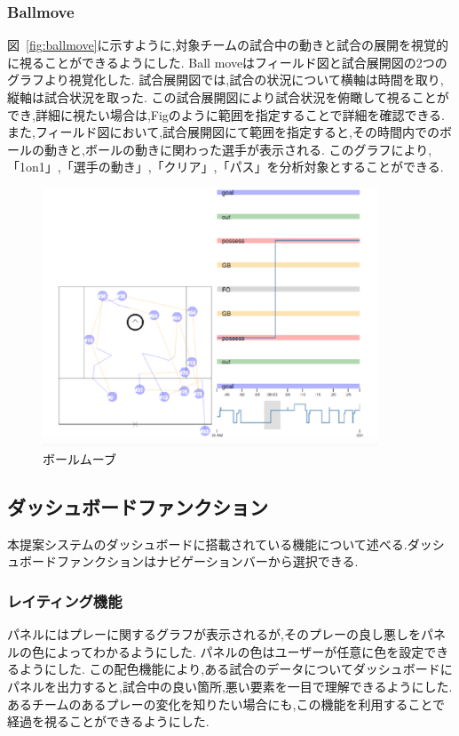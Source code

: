 \documentclass[sotsuron]{kuee}
\begin{document}
			\subsubsection{Ballmove}
				図~\ref{fig:ballmove}に示すように,対象チームの試合中の動きと試合の展開を視覚的に視ることができるようにした.
				Ball moveはフィールド図と試合展開図の2つのグラフより視覚化した.
				試合展開図では,試合の状況について横軸は時間を取り,縦軸は試合状況を取った.
				この試合展開図により試合状況を俯瞰して視ることができ,詳細に視たい場合は,Figのように範囲を指定することで詳細を確認できる.
				また,フィールド図において,試合展開図にて範囲を指定すると,その時間内でのボールの動きと,ボールの動きに関わった選手が表示される.
				このグラフにより,「1on1」,「選手の動き」,「クリア」,「パス」を分析対象とすることができる.
					\begin{figure}
						\begin{center}
							\includegraphics[width=10cm]{./eps/ballmove.eps}
						\end{center}
						\caption{ボールムーブ}
				  		\label{fig:basllmove}
					\end{figure}
		\subsection{ダッシュボードファンクション}
			本提案システムのダッシュボードに搭載されている機能について述べる.ダッシュボードファンクションはナビゲーションバーから選択できる.
			\subsubsection{レイティング機能}
			パネルにはプレーに関するグラフが表示されるが,そのプレーの良し悪しをパネルの色によってわかるようにした.
			パネルの色はユーザーが任意に色を設定できるようにした.
			この配色機能により,ある試合のデータについてダッシュボードにパネルを出力すると,試合中の良い箇所,悪い要素を一目で理解できるようにした.
			あるチームのあるプレーの変化を知りたい場合にも,この機能を利用することで経過を視ることができるようにした.
\end{document}
